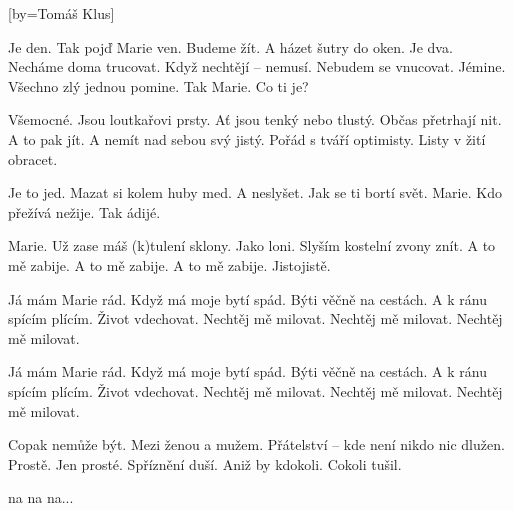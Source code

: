 [by={Tomáš Klus}]

\beginverse{}
Je den. Tak pojď Marie ven.
Budeme žít. A házet šutry do oken.
Je dva. Necháme doma trucovat.
Když nechtějí -- nemusí. Nebudem se vnucovat.
Jémine. Všechno zlý jednou pomine.
Tak Marie. Co ti je?
\endverse{}

\beginverse{}
Všemocné. Jsou loutkařovi prsty.
Ať jsou tenký nebo tlustý. Občas přetrhají nit.
A to pak jít. A nemít nad sebou svý jistý.
Pořád s tváří optimisty. Listy v žití obracet.
\endverse{}

\beginverse{}
Je to jed. Mazat si kolem huby med.
A neslyšet. Jak se ti bortí svět.
Marie. Kdo přežívá nežije. Tak ádijé. 
\endverse{}

\beginverse{}
Marie. Už zase máš (k)tulení sklony.
Jako loni. Slyším kostelní zvony znít.
A to mě zabije. A to mě zabije.
A to mě zabije. Jistojistě.
\endverse{}

\beginchorus{}
Já mám Marie rád. Když má moje bytí spád.
Býti věčně na cestách. A k ránu spícím plícím.
Život vdechovat. Nechtěj mě milovat.
Nechtěj mě milovat. Nechtěj mě milovat. 
\endchorus{}

\beginchorus{}
Já mám Marie rád. Když má moje bytí spád.
Býti věčně na cestách. A k ránu spícím plícím.
Život vdechovat. Nechtěj mě milovat.
Nechtěj mě milovat. Nechtěj mě milovat. 
\endchorus{}

\beginverse{}
Copak nemůže být. Mezi ženou a mužem.
Přátelství -- kde není nikdo nic dlužen. Prostě.
Jen prosté. Spříznění duší.
Aniž by kdokoli. Cokoli tušil.
\endverse{}

\beginverse{}
na na na...     
\endverse{}

